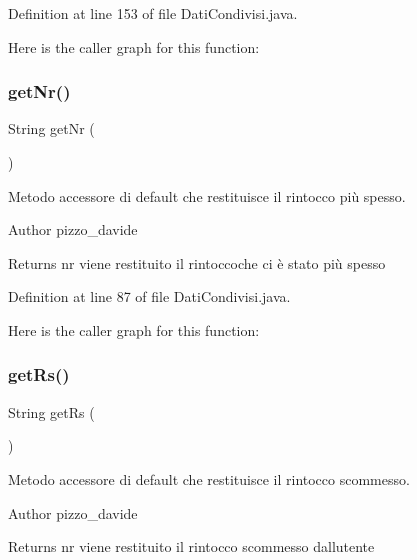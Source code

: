 Definition at line 153 of file Dati\+Condivisi.\+java.

Here is the caller graph for this function\+:
\mbox{\label{classcampane_1_1_dati_condivisi_aa769980e82eedce2d8b5d3f136848bbb}} 
\subsubsection{\texorpdfstring{get\+Nr()}{getNr()}}
{\footnotesize\ttfamily String get\+Nr (\begin{DoxyParamCaption}{ }\end{DoxyParamCaption})}



Metodo accessore di default che restituisce il rintocco più spesso. 

\begin{DoxyAuthor}{Author}
pizzo\+\_\+davide
\end{DoxyAuthor}
\begin{DoxyReturn}{Returns}
nr viene restituito il rintoccoche ci è stato più spesso 
\end{DoxyReturn}


Definition at line 87 of file Dati\+Condivisi.\+java.

Here is the caller graph for this function\+:
\mbox{\label{classcampane_1_1_dati_condivisi_a5998b9f2470790e4f3f8d831acfd7d9e}} 
\subsubsection{\texorpdfstring{get\+Rs()}{getRs()}}
{\footnotesize\ttfamily String get\+Rs (\begin{DoxyParamCaption}{ }\end{DoxyParamCaption})}



Metodo accessore di default che restituisce il rintocco scommesso. 

\begin{DoxyAuthor}{Author}
pizzo\+\_\+davide
\end{DoxyAuthor}
\begin{DoxyReturn}{Returns}
nr viene restituito il rintocco scommesso dall\textquotesingle{}utente 
\end{DoxyReturn}


